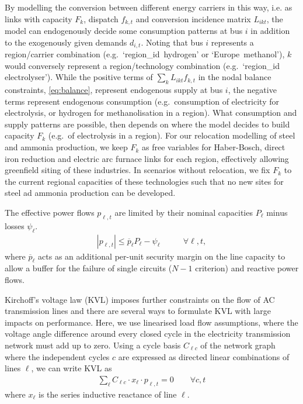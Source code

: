 By modelling the conversion between different energy carriers in this way, i.e.
as links with capacity $F_k$, dispatch $f_{k,t}$ and conversion incidence matrix
$L_{ikt}$, the model can endogenously decide some consumption patterns at bus
$i$ in addition to the exogenously given demands $d_{i,t}$. Noting that bus $i$
represents a region/carrier combination (e.g.~`region\_id~hydrogen' or
`Europe~methanol'), $k$ would conversely represent a region/technology combination
(e.g.~`region\_id electrolyser'). While the positive terms of $\sum_k L_{ikt}
f_{k,t}$ in the nodal balance constraints, \cref{eq:balance}, represent
endogenous supply at bus $i$, the negative terms represent endogenous
consumption (e.g.~consumption of electricity for electrolysis, or hydrogen for
methanolisation in a region). What consumption and supply patterns are possible,
then depends on where the model decides to build capacity $F_k$ (e.g.~of
electrolysis in a region). For our relocation modelling of steel and ammonia
production, we keep $F_k$ as free variables for Haber-Bosch, direct iron
reduction and electric arc furnace links for each region, effectively allowing
greenfield siting of these industries. In scenarios without relocation, we fix
$F_k$ to the current regional capacities of these technologies such that no new
sites for steel ad ammonia production can be developed.

The effective power flows $p_{\ell,t}$ are limited by their nominal capacities $P_\ell$ minus losses $\psi_\ell$.
\begin{align}
	|p_{\ell,t}| \leq \overline{p}_{\ell} P_{\ell} - \psi_\ell & \qquad\forall \ell, t,
	\label{eq:cap}
\end{align}
where $\overline{p}_\ell$ acts as an additional per-unit security margin on the line capacity
to allow a buffer for the failure of single circuits ($N-1$ criterion) and reactive power flows.

Kirchoff's voltage law (KVL) imposes further constraints on the flow of AC
transmission lines and there are several ways to formulate KVL with large
impacts on performance. Here, we use linearised load flow assumptions, where the
voltage angle difference around every closed cycle in the electricity
transmission network must add up to zero. Using a cycle basis $C_{\ell c}$ of
the network graph where the independent cycles $c$ are expressed as directed
linear combinations of lines $\ell$, we can write
KVL as
\begin{align}
    \sum_\ell C_{\ell c} \cdot x_\ell \cdot p_{\ell,t} = 0 \qquad\forall c,t
    \label{eq:kvl}
\end{align}
where $x_\ell$ is the series inductive reactance of line $\ell$.

